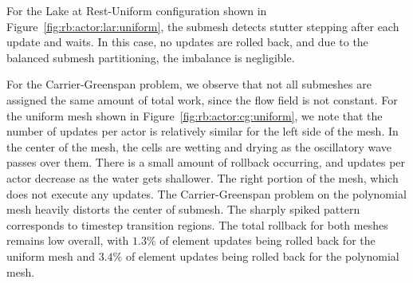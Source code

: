 \documentclass[10pt,letterpaper]{article}
\begin{document}
For the Lake at Rest-Uniform configuration shown in Figure~\ref{fig:rb:actor:lar:uniform}, the submesh detects stutter stepping after each update and waits. In this case, no updates are rolled back, and due to the balanced submesh partitioning, the imbalance is negligible.


For the Carrier-Greenspan problem, we observe that not all submeshes are assigned the same amount of total work, since the flow field is not constant. For the uniform mesh shown in Figure~\ref{fig:rb:actor:cg:uniform}, we note that the number of updates per actor is relatively similar for the left side of the mesh. In the center of the mesh, the cells are wetting and drying as the oscillatory wave passes over them. 
There is a small amount of rollback occurring, and updates per actor decrease as the water gets shallower. The right portion of the mesh, which does not execute any updates. The Carrier-Greenspan problem on the polynomial mesh heavily distorts the center of submesh. The sharply spiked pattern corresponds to timestep transition regions. The total rollback for both meshes remains low overall, with $1.3\%$ of element updates being rolled back for the uniform mesh and $3.4\%$ of element updates being rolled back for the polynomial mesh. 
\end{document}
